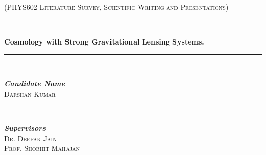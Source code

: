 \documentclass[12pt]{report}
\begin{document}
\begin{titlepage} %
	\newcommand{\HRule}{\rule{\linewidth}{0.5mm}} %
	
	\center %
	
	
	\textsc{\Large }\\[0.5cm] %
	
	\textsc{\large }\\[0.5cm] %
	
	{}
	\vspace{4mm}\\
	{\textsc{(PHYS602 Literature Survey, Scientific Writing and Presentations)}}
	\vspace{10mm}\\
	\HRule\\[0.1cm]
	{\huge\bfseries Cosmology with Strong Gravitational Lensing Systems.}\\[0.0cm] %
	\HRule\\[1.5cm]
	
	\vspace{8mm}
	\begin{minipage}{0.4\textwidth}
		\begin{flushleft}
			\large
			\textit{\textbf{Candidate Name}}
			\vspace{2mm}\\
			 \textsc{Darshan Kumar} %
		\end{flushleft}
	\end{minipage}
	~
	\begin{minipage}{0.4\textwidth}
		\begin{flushright}
			\large
			\textit{\textbf{Supervisors}}\\
			\textsc{{ Dr. Deepak Jain \\ Prof. Shobhit Mahajan}} %
		\end{flushright}
	

\end{minipage}
\end{titlepage}
\end{document}
